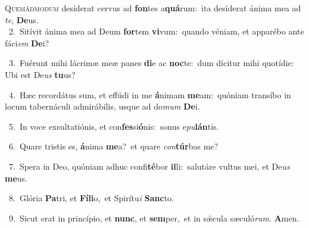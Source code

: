 \lettrine{\initial\textcolor{\initialcolor}{Q}}{uemádmodum} desíderat cervus ad \textbf{fon}\-tes a\-\textbf{quá}\-rum:~\star ita desíderat ánima mea ad \textit{te}\-, \textbf{De}\-us.\\
{\numbfont\textcolor{\numbcolor}{~2.}}~Sitívit ánima mea ad Deum \textbf{for}\-tem \textbf{vi}\-vum:~\star quando véniam, et apparébo ante fáci\textit{em} \textbf{De}\-i?\par
{\numbfont\textcolor{\numbcolor}{~3.}}~Fuérunt mihi lácrimæ meæ panes \textbf{di}\-e ac \textbf{noc}\-te:~\star dum dícitur mihi quotídie: Ubi est De\textit{us} \textbf{tu}\-us?\par
{\numbfont\textcolor{\numbcolor}{~4.}}~Hæc recordátus sum, et effúdi in me \textbf{á}\-nimam \textbf{me}\-am:~\star quóniam transíbo in locum tabernáculi admirábilis, usque ad do\textit{mum} \textbf{De}\-i.\par
{\numbfont\textcolor{\numbcolor}{~5.}}~In voce exsultatiónis, et con\-\textbf{fes}\-si\-\textbf{ó}\-nis:~\star sonus e\-\textit{pu}\-\textbf{lán}tis.\par
{\numbfont\textcolor{\numbcolor}{~6.}}~Quare tristis es, \textbf{á}\-nima \textbf{me}\-a?~\star et quare \textit{con}\-\textbf{túr}bas me?\par
{\numbfont\textcolor{\numbcolor}{~7.}}~Spera in Deo, quóniam adhuc confi\-\textbf{té}\-bor \textbf{il}\-li:~\star salutáre vultus mei, et De\textit{us} \textbf{me}\-us.\par
{\numbfont\textcolor{\numbcolor}{~8.}}~Glória \textbf{Pa}\-tri, et \textbf{Fí}\-\textbf{li}o,~\star et Spirítu\textit{i} \textbf{Sanc}\-to.\par
{\numbfont\textcolor{\numbcolor}{~9.}}~Sicut erat in princípio, et \textbf{nunc}\-, et \textbf{sem}\-per,~\star et in sǽcula sæculó\-\textit{rum}\-. \textbf{A}\-men.\par
